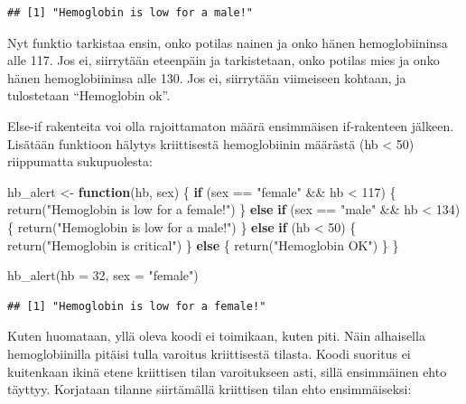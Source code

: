 \documentclass[
]{book}
\newenvironment{Shaded}{\begin{snugshade}}{\end{snugshade}}
\newcommand{\AttributeTok}[1]{\textcolor[rgb]{0.77,0.63,0.00}{#1}}
\newcommand{\ControlFlowTok}[1]{\textcolor[rgb]{0.13,0.29,0.53}{\textbf{#1}}}
\newcommand{\DecValTok}[1]{\textcolor[rgb]{0.00,0.00,0.81}{#1}}
\newcommand{\FunctionTok}[1]{\textcolor[rgb]{0.00,0.00,0.00}{#1}}
\newcommand{\NormalTok}[1]{#1}
\newcommand{\OtherTok}[1]{\textcolor[rgb]{0.56,0.35,0.01}{#1}}
\newcommand{\SpecialCharTok}[1]{\textcolor[rgb]{0.00,0.00,0.00}{#1}}
\newcommand{\StringTok}[1]{\textcolor[rgb]{0.31,0.60,0.02}{#1}}
\begin{document}
\begin{verbatim}
## [1] "Hemoglobin is low for a male!"
\end{verbatim}

Nyt funktio tarkistaa ensin, onko potilas nainen ja onko hänen hemoglobiininsa alle 117. Jos ei, siirrytään eteenpäin ja tarkistetaan, onko potilas mies ja onko hänen hemoglobiininsa alle 130. Jos ei, siirrytään viimeiseen kohtaan, ja tulostetaan ``Hemoglobin ok''.

Else-if rakenteita voi olla rajoittamaton määrä ensimmäisen if-rakenteen jälkeen. Lisätään funktioon hälytys kriittisestä hemoglobiinin määrästä (hb \textless{} 50) riippumatta sukupuolesta:

\begin{Shaded}
\begin{Highlighting}[]
\NormalTok{hb\_alert }\OtherTok{\textless{}{-}} \ControlFlowTok{function}\NormalTok{(hb, sex) \{}
  \ControlFlowTok{if}\NormalTok{ (sex }\SpecialCharTok{==} \StringTok{"female"} \SpecialCharTok{\&\&}\NormalTok{ hb }\SpecialCharTok{\textless{}} \DecValTok{117}\NormalTok{) \{}
    \FunctionTok{return}\NormalTok{(}\StringTok{"Hemoglobin is low for a female!"}\NormalTok{)}
\NormalTok{  \} }\ControlFlowTok{else} \ControlFlowTok{if}\NormalTok{ (sex }\SpecialCharTok{==} \StringTok{"male"} \SpecialCharTok{\&\&}\NormalTok{ hb }\SpecialCharTok{\textless{}} \DecValTok{134}\NormalTok{) \{}
    \FunctionTok{return}\NormalTok{(}\StringTok{"Hemoglobin is low for a male!"}\NormalTok{)}
\NormalTok{  \} }\ControlFlowTok{else} \ControlFlowTok{if}\NormalTok{ (hb }\SpecialCharTok{\textless{}} \DecValTok{50}\NormalTok{) \{}
    \FunctionTok{return}\NormalTok{(}\StringTok{"Hemoglobin is critical"}\NormalTok{)}
\NormalTok{  \} }\ControlFlowTok{else}\NormalTok{ \{}
    \FunctionTok{return}\NormalTok{(}\StringTok{"Hemoglobin OK"}\NormalTok{)}
\NormalTok{  \}}
\NormalTok{\}}

\FunctionTok{hb\_alert}\NormalTok{(}\AttributeTok{hb =} \DecValTok{32}\NormalTok{, }\AttributeTok{sex =} \StringTok{"female"}\NormalTok{)}
\end{Highlighting}
\end{Shaded}

\begin{verbatim}
## [1] "Hemoglobin is low for a female!"
\end{verbatim}

Kuten huomataan, yllä oleva koodi ei toimikaan, kuten piti. Näin alhaisella hemoglobiinilla pitäisi tulla varoitus kriittisestä tilasta. Koodi suoritus ei kuitenkaan ikinä etene kriittisen tilan varoitukseen asti, sillä ensimmäinen ehto täyttyy. Korjataan tilanne siirtämällä kriittisen tilan ehto ensimmäiseksi:
\end{document}
